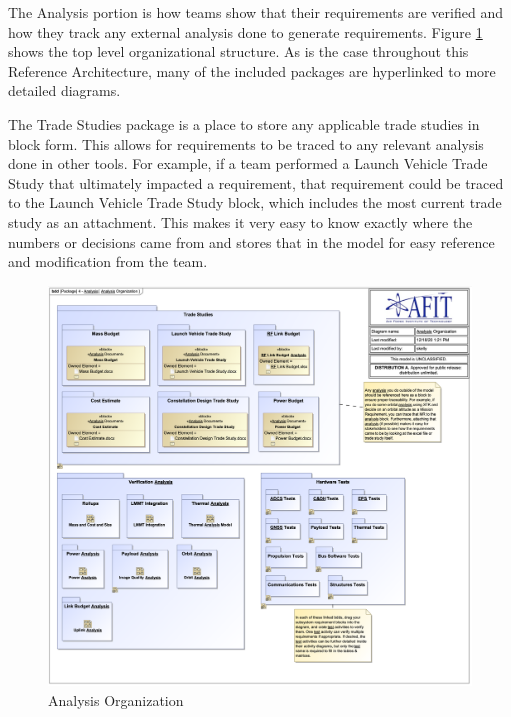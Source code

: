 The Analysis portion is how teams show that their requirements are verified and how they track any external analysis done to generate requirements. Figure \ref{fig:Analysis Organization} shows the top level organizational structure. As is the case throughout this Reference Architecture, many of the included packages are hyperlinked to more detailed diagrams. 

The Trade Studies package is a place to store any applicable trade studies in block form. This allows for requirements to be traced to any relevant analysis done in other tools. For example, if a team performed a Launch Vehicle Trade Study that ultimately impacted a requirement, that requirement could be traced to the Launch Vehicle Trade Study block, which includes the most current trade study as an attachment. This makes it very easy to know exactly where the numbers or decisions came from and stores that in the model for easy reference and modification from the team.

\begin{figure}[H]
    \centering
    \includegraphics[width=\textwidth]{Thesis/Analysis_and_Results/Analysis and Results Figures/Analysis Organization.png}
    \caption{Analysis Organization}
    \label{fig:Analysis Organization}
\end{figure}

